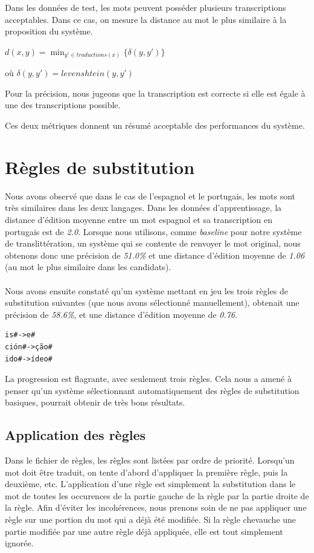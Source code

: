 \documentclass{article}
\begin{document}
Dans les données de test, les mots peuvent posséder plusieurs transcriptions acceptables. Dans ce cas, on mesure la distance au mot le plus similaire à la proposition du système.

$d(x,y) = \min_{y' \in traductions(x)} \{\delta(y,y')\}$

où $\delta(y,y')=levenshtein(y,y')$

Pour la précision, nous jugeons que la transcription est correcte si elle est égale à une des transcriptions possible.

Ces deux métriques donnent un résumé acceptable des performances du système.

\section{Règles de substitution}
Nous avons observé que dans le cas de l'espagnol et le portugais, les mots sont très similaires dans les deux langages. Dans les données d'apprentissage, la distance d'édition moyenne entre un mot espagnol et sa transcription en portugais est de \emph{2.0}.
Lorsque nous utilisons, comme \emph{baseline} pour notre système de translittération, un système qui se contente de renvoyer le mot original, nous obtenons donc une précision de \emph{51.0\%} et une distance d'édition moyenne de \emph{1.06} (au mot le plus similaire dans les candidats).

\paragraph{}
Nous avons ensuite constaté qu'un système mettant en jeu les trois règles de substitution suivantes (que nous avons sélectionné manuellement), obtenait une précision de \emph{58.6\%}, et une distance d'édition moyenne de \emph{0.76}.
\begin{verbatim}
is#->e#
ción#->ção#
ido#->ídeo#
\end{verbatim}
La progression est flagrante, avec seulement trois règles. Cela nous a amené à penser qu'un système sélectionnant automatiquement des règles de substitution basiques, pourrait obtenir de très bons résultats.

\subsection{Application des règles}
Dans le fichier de règles, les règles sont listées par ordre de priorité. Lorsqu'un mot doit être traduit, on tente d'abord d'appliquer la première règle, puis la deuxième, etc.  L'application d'une règle est simplement la substitution dans le mot de toutes les occurences de la partie gauche de la règle par la partie droite de la règle. Afin d'éviter les incohérences, nous prenons soin de ne pas appliquer une règle sur une portion du mot qui a déjà été modifiée. Si la règle chevauche une partie modifiée par une autre règle déjà appliquée, elle est tout simplement ignorée.
\end{document}
